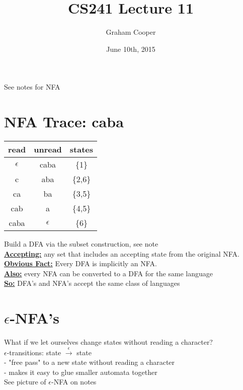\documentclass[12pt]{article}
\title{\vspace{-15ex}CS241 Lecture 11\vspace{-1ex}}
\date{June 10th, 2015}
\author{Graham Cooper}
\newcommand{\myt}[1]{\textbf{\underline{#1}}}
\begin{document}
	\maketitle
	
	See notes for NFA\\
	
	\section*{NFA Trace: caba}
	
	\begin{tabular}{c | c | c}
		read & unread & states \\ \hline
		$\epsilon$ & caba & \{1\} \\
		c & aba & \{2,6\} \\
		ca & ba & \{3,5\} \\
		cab & a & \{4,5\} \\
		caba & $\epsilon$ & \{6\} \\
	\end{tabular}
	
	Build a DFA via the subset construction, see note\\
	
	\myt{Accepting:} any set that includes an accepting state from the original NFA.\\
	
	\myt{Obvious Fact:} Every DFA is implicitly an NFA.\\
	
	\myt{Also:} every NFA can be converted to a DFA for the same language\\
	
	\myt{So:} DFA's and NFA's accept the same class of languages\\
	
	\section*{$\epsilon$-NFA's}
	What if we let ourselves change states without reading a character?\\
	
	$\epsilon$-transitions: state $\overset{\epsilon}{\rightarrow}$ state\\
	- "free pass" to a new state without reading a character\\
	- makes it easy to glue smaller automata together\\
	
	See picture of $\epsilon$-NFA on notes\\
	
\end{document}
